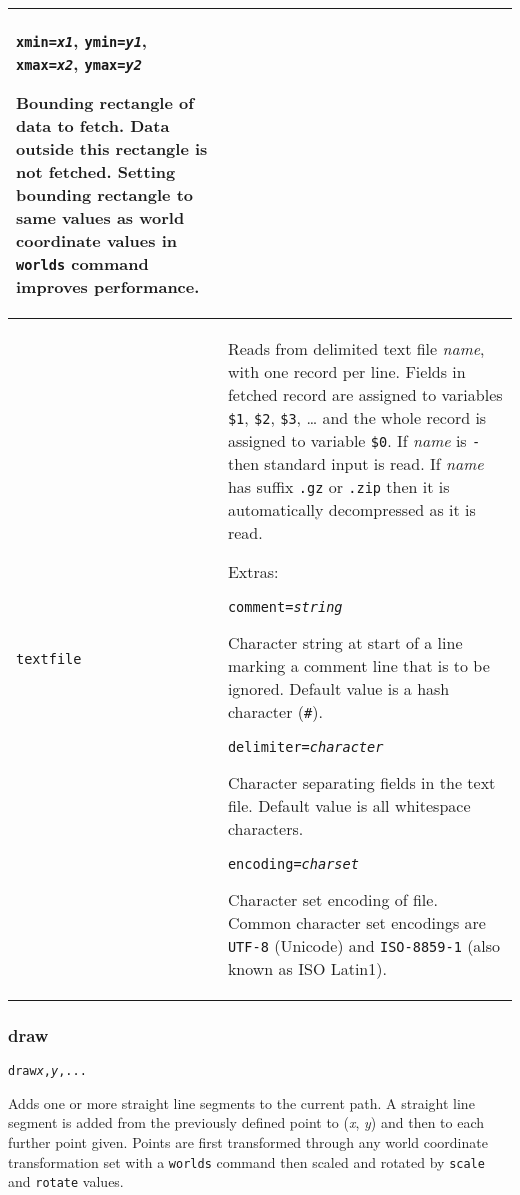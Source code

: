 \begin{longtable}{|p{3cm}|p{10cm}|}
\vspace{10pt}
\texttt{xmin=\textit{x1}},
\texttt{ymin=\textit{y1}},
\texttt{xmax=\textit{x2}},
\texttt{ymax=\textit{y2}}

Bounding rectangle of data to fetch.  Data outside this rectangle is
not fetched.  Setting bounding rectangle to same values as world
coordinate values in \texttt{worlds} command improves performance. \\

\hline

\texttt{textfile} &
Reads from delimited text file \textit{name}, with one
record per line.  Fields in fetched record
are assigned to variables
\texttt{\$1}, \texttt{\$2}, \texttt{\$3}, \dots
and the whole record is assigned to variable
\texttt{\$0}.
If \textit{name} is \texttt{-} then standard input is read.
If \textit{name} has suffix \texttt{.gz} or \texttt{.zip}
then it is automatically decompressed as it is read.

\vspace{10pt}
Extras:

\texttt{comment=\textit{string}}

Character string at start of a line marking a comment line that
is to be ignored.  Default value is a hash character (\texttt{\#}).

\vspace{10pt}
\texttt{delimiter=\textit{character}}

Character separating fields in the text file.  Default value
is all whitespace characters.

\vspace{10pt}
\texttt{encoding=\textit{charset}}

Character set encoding of file.
Common character set encodings are \texttt{UTF-8} (Unicode) and
\texttt{ISO-8859-1} (also known as ISO Latin1). \\

\end{longtable}

\subsubsection{draw}

\begin{alltt}
draw \textit{x}, \textit{y}, ...
\end{alltt}

Adds one or more straight line segments to the current path.
A straight line segment is added from the previously defined point
to (\textit{x}, \textit{y}) and then to each further point given.
Points are first transformed through any world coordinate
transformation set with a \texttt{worlds} command
then scaled and rotated by \texttt{scale}
and \texttt{rotate} values.

